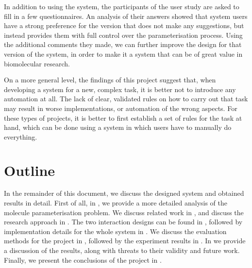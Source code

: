 In addition to using the system, the participants of the user study are asked to fill in a few questionnaires. An analysis of their answers showed that system users have a strong preference for the version that does not make any suggestions, but instead provides them with full control over the parameterisation process. Using the additional comments they made, we can further improve the design for that version of the system, in order to make it a system that can be of great value in biomolecular research.

On a more general level, the findings of this project suggest that, when developing a system for a new, complex task, it is better not to introduce any automation at all. The lack of clear, validated rules on how to carry out that task may result in worse implementations, or automation of the wrong aspects. For these types of projects, it is better to first establish a set of rules for the task at hand, which can be done using a system in which users have to manually do everything.



\section{Outline}
In the remainder of this document, we discuss the designed system and obtained results in detail. First of all, in , we provide a more detailed analysis of the molecule parameterisation problem. We discuss related work in , and discuss the research approach in . The two interaction designs can be found in , followed by implementation details for the whole system in . We discuss the evaluation methods for the project in , followed by the experiment results in . In  we provide a discussion of the results, along with threats to their validity and future work. Finally, we present the conclusions of the project in .
